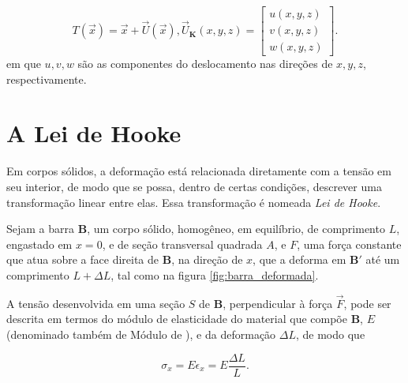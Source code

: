 \begin{equation}
    T(\vec{x}) = \vec{x} + \vec{U}(\vec{x}),
    \vec{U}_{\bm{K}}(x,y,z) = \begin{bmatrix}
        u(x,y,z) \\ v(x,y,z) \\ w(x,y,z) 
    \end{bmatrix}.
\end{equation}
em que $u, v, w$ são as componentes do deslocamento nas direções de $x, y, z$, respectivamente.



\section{A Lei de Hooke}

Em corpos sólidos, a deformação está relacionada diretamente com a tensão em seu interior, de modo que se possa, dentro de certas condições, descrever uma transformação linear entre elas. Essa transformação é nomeada \emph{Lei de Hooke}.

Sejam a barra $\bm{B}$, um corpo sólido, homogêneo, em equilíbrio, de comprimento $L$, engastado em $x=0$, e de seção transversal quadrada $A$, e $F$, uma força constante que atua sobre a face direita de $\bm{B}$, na direção de $x$, que a deforma em $\bm{B}'$ até um comprimento $L+\Delta L$, tal como na figura \ref{fig:barra_deformada}. 



A tensão desenvolvida em uma seção $S$ de $\bm{B}$, perpendicular à força $\vec{F}$, pode ser descrita em termos do módulo de elasticidade do material que compõe $\bm{B}$, $E$ (denominado também de Módulo de ), e da deformação $\Delta L$, de modo que

\begin{equation}
    \sigma_x = E \epsilon_x = E \frac{\Delta L}{L}.
\end{equation}